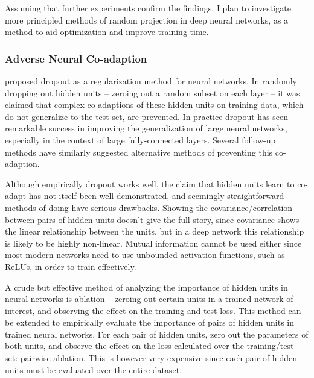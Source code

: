 \documentclass[thesis]{subfiles}
\begin{document}
Assuming that further experiments confirm the findings, I plan to investigate more principled methods of random projection in deep neural networks, as a method to aid optimization and improve training time.%


\subsubsection{Adverse Neural Co-adaption}
\citet{Hinton2012} proposed dropout as a regularization method for neural networks. In randomly dropping out hidden units -- zeroing out a random subset on each layer -- it was claimed that complex co-adaptions of these hidden units on training data, which do not generalize to the test set, are prevented. In practice dropout has seen remarkable success in improving the generalization of large neural networks, especially in the context of large fully-connected layers. Several follow-up methods have similarly suggested alternative methods of preventing this co-adaption.

Although empirically dropout works well, the claim that hidden units learn to co-adapt has not itself been well demonstrated, and seemingly straightforward methods of doing have serious drawbacks. Showing the covariance/correlation between pairs of hidden units doesn't give the full story, since covariance shows the linear relationship between the units, but in a deep network this relationship is likely to be highly non-linear. Mutual information cannot be used either since most modern networks need to use unbounded activation functions, such as ReLUs, in order to train effectively.

A crude but effective method of analyzing the importance of hidden units in neural networks is ablation -- zeroing out certain units in a trained network of interest, and observing the effect on the training and test loss. This method can be extended to empirically evaluate the importance of pairs of hidden units in trained neural networks. For each pair of hidden units, zero out the parameters of both units, and observe the effect on the loss calculated over the training/test set: pairwise ablation. This is however very expensive since each pair of hidden units must be evaluated over the entire dataset. 
\end{document}
